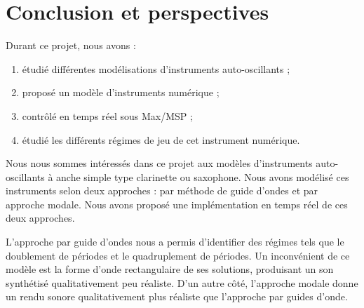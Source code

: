 \documentclass[french, twocolumn]{article}
\begin{document}

\newpage

\section{Conclusion et perspectives}

Durant ce projet, nous avons :
\begin{enumerate}
    \item étudié différentes modélisations d'instruments auto-oscillants ;
    \item proposé un modèle d'instruments numérique ;
    \item contrôlé en temps réel sous Max/MSP ;
    \item étudié les différents régimes de jeu de cet instrument numérique.
\end{enumerate}


Nous nous sommes intéressés dans ce projet aux modèles d'instruments auto-oscillants à anche simple type clarinette ou saxophone. Nous avons modélisé ces instruments selon deux approches : par méthode de guide d'ondes et par approche modale. Nous avons proposé une implémentation en temps réel de ces deux approches. 

L'approche par guide d'ondes nous a permis d'identifier des régimes tels que le doublement de périodes et le quadruplement de périodes. Un inconvénient de ce modèle est la forme d'onde rectangulaire de ses solutions, produisant un son synthétisé qualitativement peu réaliste.  D'un autre côté, l'approche modale donne un rendu sonore qualitativement plus réaliste que l'approche par guides d'onde.
\end{document}
